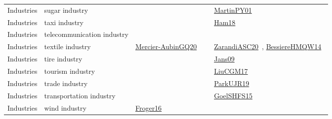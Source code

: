 {\begin{longtable}{lp{3cm}>{\raggedright\arraybackslash}p{6cm}>{\raggedright\arraybackslash}p{6cm}>{\raggedright\arraybackslash}p{8cm}}
\index{sugar industry}\index{Industries!sugar industry}Industries & sugar industry &  &  & \href{../works/MartinPY01.pdf}{MartinPY01}~\cite{MartinPY01}\\
\index{taxi industry}\index{Industries!taxi industry}Industries & taxi industry &  &  & \href{../works/Ham18.pdf}{Ham18}~\cite{Ham18}\\
\index{telecommunication industry}\index{Industries!telecommunication industry}Industries & telecommunication industry &  &  & \\
\index{textile industry}\index{Industries!textile industry}Industries & textile industry & \href{../works/Mercier-AubinGQ20.pdf}{Mercier-AubinGQ20}~\cite{Mercier-AubinGQ20} &  & \href{../works/ZarandiASC20.pdf}{ZarandiASC20}~\cite{ZarandiASC20}, \href{../works/BessiereHMQW14.pdf}{BessiereHMQW14}~\cite{BessiereHMQW14}\\
\index{tire industry}\index{Industries!tire industry}Industries & tire industry &  &  & \href{../works/Jans09.pdf}{Jans09}~\cite{Jans09}\\
\index{tourism industry}\index{Industries!tourism industry}Industries & tourism industry &  &  & \href{../works/LiuCGM17.pdf}{LiuCGM17}~\cite{LiuCGM17}\\
\index{trade industry}\index{Industries!trade industry}Industries & trade industry &  &  & \href{../works/ParkUJR19.pdf}{ParkUJR19}~\cite{ParkUJR19}\\
\index{transportation industry}\index{Industries!transportation industry}Industries & transportation industry &  &  & \href{../works/GoelSHFS15.pdf}{GoelSHFS15}~\cite{GoelSHFS15}\\
\index{wind industry}\index{Industries!wind industry}Industries & wind industry & \href{../works/Froger16.pdf}{Froger16}~\cite{Froger16} &  & \\
\end{longtable}
}

